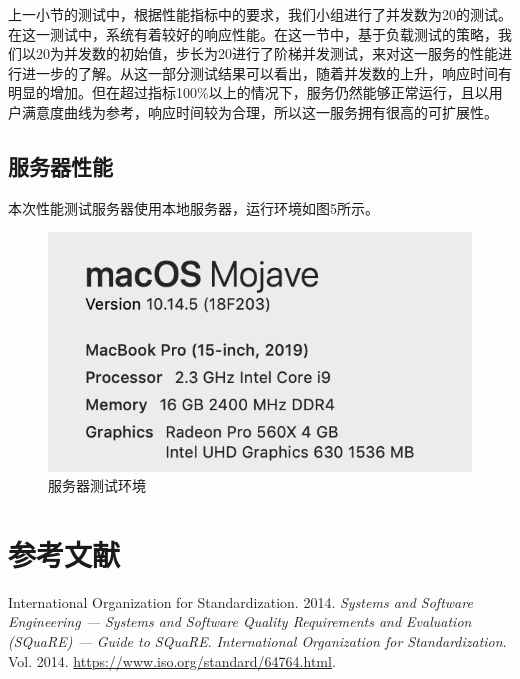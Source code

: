 \documentclass[hyperref, a4paper]{ctexart}
\begin{document}
上一小节的测试中，根据性能指标中的要求，我们小组进行了并发数为20的测试。在这一测试中，系统有着较好的响应性能。在这一节中，基于负载测试的策略，我们以20为并发数的初始值，步长为20进行了阶梯并发测试，来对这一服务的性能进行进一步的了解。从这一部分测试结果可以看出，随着并发数的上升，响应时间有明显的增加。但在超过指标100\%以上的情况下，服务仍然能够正常运行，且以用户满意度曲线为参考，响应时间较为合理，所以这一服务拥有很高的可扩展性。

\hypertarget{ux670dux52a1ux5668ux6027ux80fd}{%
\subsection{服务器性能}\label{ux670dux52a1ux5668ux6027ux80fd}}

本次性能测试服务器使用本地服务器，运行环境如图5所示。

\begin{figure}
\centering
\includegraphics{resources/wcn/environment.png}
\caption{服务器测试环境}
\end{figure}

\pagebreak

\hypertarget{ux53c2ux8003ux6587ux732e}{%
\section*{参考文献}\label{ux53c2ux8003ux6587ux732e}}

\hypertarget{refs}{}
\leavevmode\hypertarget{ref-innovativeInternationalisation}{}%
International Organization for Standardization. 2014. \emph{Systems and
Software Engineering --- Systems and Software Quality Requirements and
Evaluation (SQuaRE) --- Guide to SQuaRE}. \emph{International
Organization for Standardization}. Vol. 2014.
\url{https://www.iso.org/standard/64764.html}.
\end{document}
